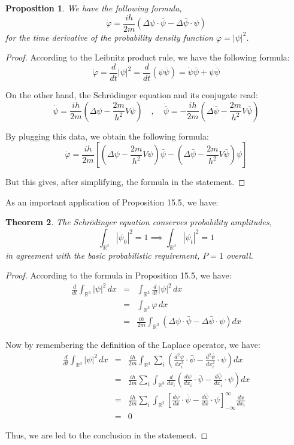 \documentclass[12pt]{amsbook}
\newtheorem{theorem}{Theorem}[chapter]
\newtheorem{proposition}[theorem]{Proposition}
\begin{document}
\begin{proposition}
We have the following formula, 
$$\dot{\varphi}=\frac{ih}{2m}\left(\Delta\psi\cdot\bar{\psi}-\Delta\bar{\psi}\cdot\psi\right)$$
for the time derivative of the probability density function $\varphi=|\psi|^2$.
\end{proposition}

\begin{proof}
According to the Leibnitz product rule, we have the following formula:
$$\dot{\varphi}=\frac{d}{dt}|\psi|^2=\frac{d}{dt}(\psi\bar{\psi})=\dot{\psi}\bar{\psi}+\psi\dot{\bar{\psi}}$$

On the other hand, the Schr\"odinger equation and its conjugate read:
$$\dot{\psi}=\frac{ih}{2m}\left(\Delta\psi-\frac{2m}{h^2}V\psi\right)\quad,\quad 
\dot{\bar{\psi}}=-\frac{ih}{2m}\left(\Delta\bar{\psi}-\frac{2m}{h^2}V\bar{\psi}\right)$$

By plugging this data, we obtain the following formula:
$$\dot{\varphi}
=\frac{ih}{2m}\left[\left(\Delta\psi-\frac{2m}{h^2}V\psi\right)\bar{\psi}-\left(\Delta\bar{\psi}-\frac{2m}{h^2}V\bar{\psi}\right)\psi\right]$$

But this gives, after simplifying, the formula in the statement.
\end{proof}

As an important application of Proposition 15.5, we have:

\begin{theorem}
The Schr\"odinger equation conserves probability amplitudes,
$$\int_{\mathbb R^3}|\psi_0|^2=1\implies\int_{\mathbb R^3}|\psi_t|^2=1$$
in agreement with the basic probabilistic requirement, $P=1$ overall.
\end{theorem}

\begin{proof}
According to the formula in Proposition 15.5, we have:
\begin{eqnarray*}
\frac{d}{dt}\int_{\mathbb R^3}|\psi|^2\,dx
&=&\int_{\mathbb R^3}\frac{d}{dt}|\psi|^2\,dx\\
&=&\int_{\mathbb R^3}\dot{\varphi}\,dx\\
&=&\frac{ih}{2m}\int_{\mathbb R^3}\left(\Delta\psi\cdot\bar{\psi}-\Delta\bar{\psi}\cdot\psi\right)dx
\end{eqnarray*}

Now by remembering the definition of the Laplace operator, we have:
\begin{eqnarray*}
\frac{d}{dt}\int_{\mathbb R^3}|\psi|^2\,dx
&=&\frac{ih}{2m}\int_{\mathbb R^3}\sum_i\left(\frac{d^2\psi}{dx_i^2}\cdot\bar{\psi}-\frac{d^2\bar{\psi}}{dx_i^2}\cdot\psi\right)dx\\
&=&\frac{ih}{2m}\sum_i\int_{\mathbb R^3}\frac{d}{dx_i}\left(\frac{d\psi}{dx_i}\cdot\bar{\psi}-\frac{d\bar{\psi}}{dx_i}\cdot\psi\right)dx\\
&=&\frac{ih}{2m}\sum_i\int_{\mathbb R^2}\left[\frac{d\psi}{dx}\cdot\bar{\psi}-\frac{d\bar{\psi}}{dx}\cdot\psi\right]_{-\infty}^\infty\frac{dx}{dx_i}\\
&=&0
\end{eqnarray*}

Thus, we are led to the conclusion in the statement.
\end{proof}
\end{document}

